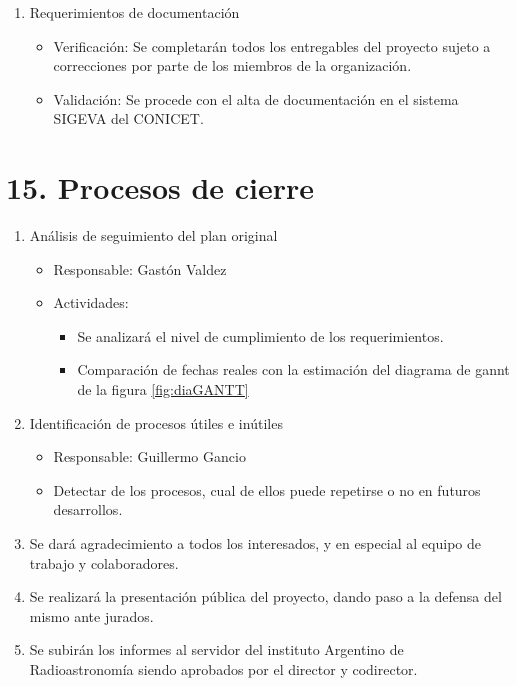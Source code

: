 \documentclass[11pt, %
codirector, %
]{charter}
\begin{document}
\begin{enumerate}
\item Requerimientos de documentación 
\begin{itemize}

	\item Verificación: Se completarán todos los entregables del proyecto sujeto a correcciones por parte de los miembros de la organización.  
	\item Validación: Se procede con el alta de documentación en el sistema SIGEVA del CONICET. 

\end{itemize}
\end{enumerate}




\section{15. Procesos de cierre}    
\label{sec:cierre}
\begin{enumerate}
	\item Análisis de seguimiento del plan original 
		\begin{itemize}
		\item Responsable: Gastón Valdez
		\item Actividades: 
			\begin{itemize}
				\item Se analizará el nivel de cumplimiento de los requerimientos.
				\item Comparación de fechas reales con la estimación del diagrama de gannt de la figura 	\ref{fig:diaGANTT}
			\end{itemize}
		\end{itemize}
	\item Identificación de procesos útiles e inútiles
		\begin{itemize}
			\item Responsable: Guillermo Gancio 
			\item Detectar de los procesos, cual de ellos puede repetirse o no en futuros desarrollos. 
		\end{itemize}
	\item Se dará agradecimiento a todos los interesados, y en especial al equipo de trabajo y
	colaboradores.
	\item Se realizará la presentación pública del proyecto, dando paso a la defensa del mismo ante jurados. 
	\item Se subirán los informes al servidor del instituto Argentino de Radioastronomía siendo aprobados por el director y codirector. 
\end{enumerate}
\end{document}
